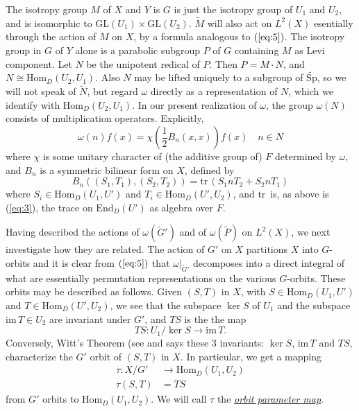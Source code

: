 \documentclass[12pt]{amsart}
\def\emp#1{\underline{\em #1}}
\def\tSp{{\widetilde{\mathrm{Sp}}}}
\def\GL{{\mathrm{GL}}}
\def\Hom{{\mathrm{Hom}}}
\def\End{{\mathrm{End}}}
\def\im{{\mathrm{im\,}}}
\def\tP{{\widetilde{P}}}
\def\tM{{\widetilde{M}}}
\def\tG{{\widetilde{G}}}
\def\tr{{\mathrm{tr\,}}}
\begin{document}
The isotropy group $M$ of $X$ and $Y$ is $G$ is just the isotropy group
of $U_1$ and $U_2$, and is isomorphic to $\GL(U_1)\times\GL(U_2)$.
$\tM$ will also act on $L^2(X)$ esentially through the action of $M$ on $X$, 
by a formula analogous to $(\ref{eq:5})$. 
The isotropy group in $G$ of $Y$ alone is a parabolic subgroup $P$ of $G$ 
containing $M$ as Levi component. Let $N$ be the unipotent redical of $P$. 
Then $P=M\cdot N$, and $N\cong \Hom_D(U_2,U_1)$. 
Also $N$ may be lifted uniquely to a subgroup of $\tSp$, so 
we will not speak of $\widetilde{N}$, but regard $\omega$ directly 
as a representation of $N$, which we identify with 
$\Hom_D(U_2,U_1)$. In our present realization of $\omega$, the group 
$\omega(N)$ consists of multiplication operators. 
Explicitly, 
\begin{equation}\label{eq:7}
\omega(n)f(x) = \chi(\frac{1}{2}B_n(x,x))f(x)\quad n\in N
\end{equation}
where $\chi$ is some unitary character of (the additive group of) $F$
determined by $\omega$, and $B_n$ is a symmetric bilinear form on $X$, 
defined by 
\begin{equation}\label{eq:8}
B_n((S_1,T_1),(S_2,T_2)) = \tr(S_1n T_2 + S_2n T_1) 
\end{equation}
where $S_i\in \Hom_D(U_1,U')$ and $T_i\in \Hom_D(U',U_2)$, and 
$\tr$ is, as above is (\ref{eq:3}), the trace on $\End_D(U')$
as algebra over $F$.

Having described the actions of $\omega(\tG')$ and of $\omega(\tP)$
on $L^2(X)$, we next investigate how they are related. 
The action of $G'$ on $X$ partitions $X$ into $G$-orbits and 
it is clear from $(\ref{eq:5})$ that $\omega|_{\tG'}$ decomposes into
a direct integral of what are essentially permutation 
representations on the various $G$-orbits. 
These orbits may be described as follows. 
Given $(S,T)$ in $X$, with $S\in \Hom_D(U_1,U')$ and 
$T\in \Hom_D(U',U_2)$, we see that the subspace $\ker S$ of
$U_1$ and the subspace $\im T\in U_2$ are invariant under $G'$, 
and $TS$ is the the map 
\[
TS: U_1/\ker S \to \im T.
\]
Conversely, Witt's Theorem (see \cite{Jacobson1953} and \cite{HoweOsc1}
says these $3$ invariants:
$\ker S$, $\im T$ and $TS$, characterize the $G'$ orbit of $(S,T)$ in $X$. 
In particular, we get a mapping 
\begin{equation}\label{eq:9}
\begin{split}
\tau:X/G' &\to \Hom_D(U_1,U_2)\\
\tau(S,T) &= TS
\end{split}
\end{equation}
from $G'$ orbits to $\Hom_D(U_1,U_2)$. We will call $\tau$ the 
\emp{orbit parameter map}.
\end{document}
